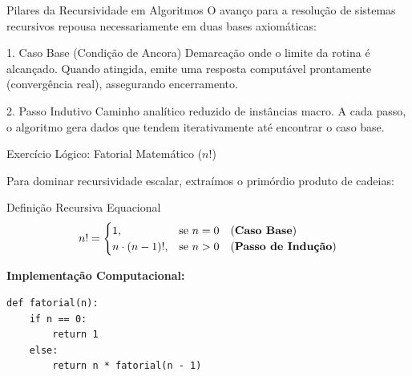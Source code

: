 \documentclass{beamer}
\begin{document}
\begin{frame}{Pilares da Recursividade em Algoritmos}
O avanço para a resolução de sistemas recursivos repousa necessariamente em duas bases axiomáticas:
\pause
\vspace{0.3cm}

\begin{alertblock}{1. Caso Base (Condição de Ancora)}
Demarcação onde o limite da rotina é alcançado. Quando atingida, emite uma resposta computável prontamente (convergência real), assegurando encerramento.
\end{alertblock}
\pause
\begin{block}{2. Passo Indutivo}
Caminho analítico reduzido de instâncias macro. A cada passo, o algoritmo gera dados que tendem iterativamente até encontrar o caso base.
\end{block}
\end{frame}

\begin{frame}[fragile]{Exercício Lógico: Fatorial Matemático ($n!$)}

Para dominar recursividade escalar, extraímos o primórdio produto de cadeias: 
\begin{block}{Definição Recursiva Equacional}
  \begin{equation*}
  n! =
    \begin{cases}
      1, & \text{se } n = 0 \quad \text{(\textbf{Caso Base})}  \\      
      n \cdot (n-1)!, & \text{se } n > 0 \quad \text{(\textbf{Passo de Indução})}
    \end{cases}       
  \end{equation*}
\end{block}
\pause
\textbf{Implementação Computacional:}
\begin{verbatim}
def fatorial(n):
    if n == 0:
        return 1 
    else:
        return n * fatorial(n - 1)  
\end{verbatim}
\end{frame}
\end{document}
